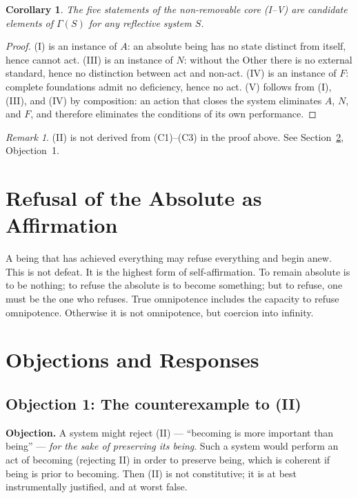 \documentclass[11pt]{article}
\newtheorem{corollary}{Corollary}
\theoremstyle{remark}
\newtheorem{remark}{Remark}
\begin{document}
\begin{corollary}
\label{cor:core}
The five statements of the non-removable core (I--V) are candidate elements of \(\Gamma(S)\) for any reflective system \(S\).
\end{corollary}

\begin{proof}
(I) is an instance of \(A\): an absolute being has no state distinct from itself, hence cannot act. (III) is an instance of \(N\): without the Other there is no external standard, hence no distinction between act and non-act. (IV) is an instance of \(F\): complete foundations admit no deficiency, hence no act. (V) follows from (I), (III), and (IV) by composition: an action that closes the system eliminates \(A\), \(N\), and \(F\), and therefore eliminates the conditions of its own performance.
\end{proof}

\begin{remark}
(II) is not derived from (C1)--(C3) in the proof above. See Section~\ref{sec:objections}, Objection~1.
\end{remark}

\section{Refusal of the Absolute as Affirmation}

A being that has achieved everything may refuse everything and begin anew. This is not defeat. It is the highest form of self-affirmation. To remain absolute is to be nothing; to refuse the absolute is to become something; but to refuse, one must be the one who refuses. True omnipotence includes the capacity to refuse omnipotence. Otherwise it is not omnipotence, but coercion into infinity.

\section{Objections and Responses}
\label{sec:objections}

\subsection*{Objection 1: The counterexample to (II)}

\textbf{Objection.} A system might reject (II) --- ``becoming is more important than being'' --- \emph{for the sake of preserving its being}. Such a system would perform an act of becoming (rejecting II) in order to preserve being, which is coherent if being is prior to becoming. Then (II) is not constitutive; it is at best instrumentally justified, and at worst false.
\end{document}
